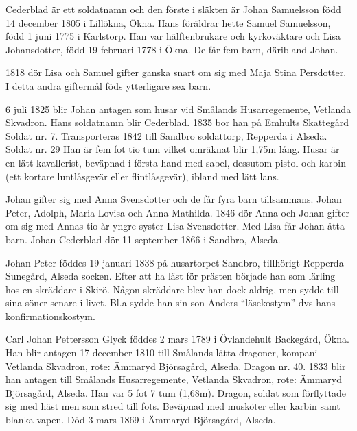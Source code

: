 

{\footline{}%

}

\def\person#1{%
	\vfill\break
	\ifodd\pageno
		\else \null \vfill\break
	\fi
	{\typosize[15/]\currvar 
	 \smash{\centerline{#1}}%
	 \vskip4\baselineskip
	}%
}

\def\couple#1#2{%
	\vfill\break
	\ifodd\pageno
		\else \null \vfill\break
	\fi
	{\typosize[15/]\currvar 
	 \smash{\centerline{#1}}%
	 \vskip0.5\baselineskip
	 \smash{\centerline{\&}}%
	 \vskip0.5\baselineskip
	 \smash{\centerline{#2}}%
	 \baselineskip
	}%
}

\person{Johan Peter Cederblad}

\noindent Cederblad är ett soldatnamn och den förste i släkten är Johan Samuelsson född 14 december 1805 i Lillökna, Ökna. Hans föräldrar hette Samuel Samuelsson, född 1 juni 1775 i Karlstorp. Han var hälftenbrukare och kyrkoväktare och Lisa Johansdotter, född 19 februari 1778 i Ökna. De får fem barn, däribland Johan.

1818 dör Lisa och Samuel gifter ganska snart om sig med Maja Stina Persdotter. I detta andra giftermål föds ytterligare sex barn.

6 juli 1825 blir Johan antagen som husar vid Smålands Husarregemente, Vetlanda Skvadron. Hans soldatnamn blir Cederblad. 1835 bor han på Emhults Skattegård Soldat nr. 7. Transporteras 1842 till Sandbro soldattorp, Repperda i Alseda. Soldat nr. 29 
Han är fem fot tio tum vilket omräknat blir 1,75m lång.
Husar är en lätt kavallerist, beväpnad i första hand med sabel, dessutom pistol och karbin (ett kortare luntlåsgevär eller flintlåsgevär), ibland med lätt lans.

Johan gifter sig med Anna Svensdotter och de får fyra barn tillsammans. Johan Peter, Adolph, Maria Lovisa och Anna Mathilda. 1846 dör Anna och Johan gifter om sig med Annas tio år yngre syster Lisa Svensdotter. Med Lisa får Johan åtta barn.
Johan Cederblad dör 11 september 1866 i Sandbro, Alseda.

Johan Peter föddes 19 januari 1838 på husartorpet Sandbro, tillhörigt Repperda Sunegård, Alseda socken.
Efter att ha läst för prästen började han som lärling hos en skräddare i Skirö. Någon skräddare blev han dock aldrig, men sydde till sina söner senare i livet. Bl.a sydde han sin son Anders “läsekostym” dvs hans konfirmationskostym.


\person{Johanna Christina Lång}

\noindent Carl Johan Pettersson Glyck föddes 2 mars 1789 i Övlandehult Backegård, Ökna.
Han blir antagen 17 december 1810 till Smålands lätta dragoner, kompani Vetlanda Skvadron, rote: Ämmaryd Björsagård, Alseda. Dragon nr. 40.
1833 blir han antagen till Smålands Husarregemente, Vetlanda Skvadron, rote: Ämmaryd Björsagård, Alseda. Han var 5 fot 7 tum (1,68m).
Dragon, soldat som förflyttade sig med häst men som stred till fots. Beväpnad med musköter eller karbin samt blanka vapen.
Död 3 mars 1869 i Ämmaryd Björsagård, Alseda.

